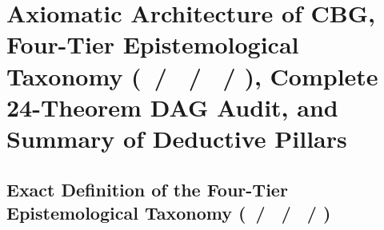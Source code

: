 \documentclass[11pt,a4paper]{article}
\newcommand{\catA}{\text{\textbf{\textcolor{purple!80!black}{[A]}}}}
\newcommand{\catD}{\text{\textbf{\textcolor{blue!75!black}{[D]}}}}
\newcommand{\catH}{\text{\textbf{\textcolor{orange!80!black}{[H]}}}}
\newcommand{\catN}{\text{\textbf{\textcolor{teal!75!black}{[N]}}}}
\theoremstyle{definition}
\theoremstyle{plain}
\theoremstyle{remark}
\begin{document}
\section{\texorpdfstring{Axiomatic Architecture of CBG, Four-Tier Epistemological Taxonomy (\catA\ / \catD\ / \catH\ / \catN), Complete 24-Theorem DAG Audit, and Summary of Deductive Pillars}{Axiomatic Architecture of CBG, Four-Tier Epistemological Taxonomy ([A] / [D] / [H] / [N]), Complete 24-Theorem DAG Audit, and Summary of Deductive Pillars}}
\label{sec:c7_axiomatic_conclusions}

\subsection{Exact Definition of the Four-Tier Epistemological Taxonomy (\catA\ / \catD\ / \catH\ / \catN)}
\end{document}
